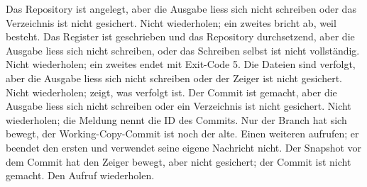 \startplacetable[title={Exit-Code 3 und der nächste Schritt},reference=tab:exit3,location=split]
\startxtable[frame=off,split=yes,option=stretch,align={flushleft,high}]
\startxtablehead
\startxrow[topframe=on,bottomframe=on]
 \stopxcell
{} \stopxcell
{} \stopxcell
\stopxrow
\stopxtablehead
\startxtablenext
\startxrow[topframe=on,bottomframe=on]
 \stopxcell
{} \stopxcell
{} \stopxcell
\stopxrow
\stopxtablenext
\startxrow
\startxcell[width=0.26\textwidth]  \stopxcell
\startxcell[width=0.35\textwidth] Das Repository ist angelegt,
aber die Ausgabe liess sich nicht schreiben oder das Verzeichnis ist nicht gesichert. \stopxcell
\startxcell Nicht wiederholen;
ein zweites  bricht ab, weil  besteht. \stopxcell
\stopxrow
\startxrow
\startxcell[width=0.26\textwidth]  \stopxcell
\startxcell[width=0.35\textwidth] Das Register ist geschrieben und das Repository durchsetzend,
aber die Ausgabe liess sich nicht schreiben,
oder das Schreiben selbst ist nicht vollständig. \stopxcell
\startxcell Nicht wiederholen;
ein zweites  endet mit Exit-Code 5. \stopxcell
\stopxrow
\startxrow
\startxcell[width=0.26\textwidth]  \stopxcell
\startxcell[width=0.35\textwidth] Die Dateien sind verfolgt,
aber die Ausgabe liess sich nicht schreiben oder der Zeiger ist nicht gesichert. \stopxcell
\startxcell Nicht wiederholen;  zeigt, was verfolgt ist. \stopxcell
\stopxrow
\startxrow
\startxcell[width=0.26\textwidth]  \stopxcell
\startxcell[width=0.35\textwidth] Der Commit ist gemacht,
aber die Ausgabe liess sich nicht schreiben oder ein Verzeichnis ist nicht gesichert. \stopxcell
\startxcell Nicht wiederholen; die Meldung nennt die ID des Commits. \stopxcell
\stopxrow
\startxrow
\startxcell[width=0.26\textwidth]  \stopxcell
\startxcell[width=0.35\textwidth] Nur der Branch hat sich bewegt,
der Working-Copy-Commit ist noch der alte. \stopxcell
\startxcell Einen weiteren  aufrufen;
er beendet den ersten und verwendet seine eigene Nachricht nicht. \stopxcell
\stopxrow
\startxrow
\startxcell[width=0.26\textwidth]  \stopxcell
\startxcell[width=0.35\textwidth] Der Snapshot vor dem Commit hat den Zeiger bewegt,
aber nicht gesichert; der Commit ist nicht gemacht. \stopxcell
\startxcell Den Aufruf wiederholen. \stopxcell

